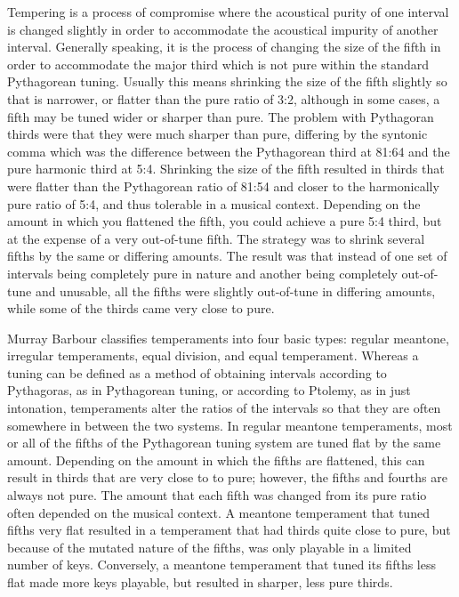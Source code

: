 Tempering is a process of compromise where the acoustical purity of one interval
is changed slightly in order to accommodate the acoustical impurity of another
interval.  Generally speaking, it is the process of changing the size of the fifth in
order to accommodate the major third which is not pure within the standard
Pythagorean tuning. Usually this means shrinking the size of the fifth slightly
so that is narrower, or flatter than the pure ratio of 3:2, although in some
cases, a fifth may be tuned wider or sharper than pure. The problem with
Pythagoran thirds were that they were much sharper than pure, differing by the
syntonic comma which was the difference between the Pythagorean third at 81:64
and the pure harmonic third at 5:4. Shrinking the size of the fifth resulted in
thirds that were flatter than the Pythagorean ratio of 81:54 and closer to the harmonically
pure ratio of 5:4, and thus tolerable
in a musical context.  Depending on the amount in which you flattened the fifth, you
could achieve a pure 5:4 third, but at the expense of a very out-of-tune fifth.  The
strategy was to shrink several fifths by the same or differing amounts. The result
was that instead of one set of intervals being completely pure in nature and
another being completely out-of-tune and unusable, all the fifths were slightly out-of-tune
in differing amounts, while some of the thirds came very close to pure.

Murray Barbour classifies temperaments into four basic types: regular meantone,
irregular temperaments, equal division, and equal temperament. Whereas
a tuning can be defined as a method of obtaining intervals according to
Pythagoras, as in Pythagorean tuning, or according to Ptolemy, as in
just intonation, temperaments alter the ratios of the intervals so
that they are often somewhere in between the two systems. In regular
meantone temperaments, most or all of the fifths of the Pythagorean tuning system
are tuned flat by the same amount.  Depending on the amount in which the fifths are
flattened, this can result in thirds that are very close to
to pure; however, the fifths and fourths are always not pure.  The amount
that each fifth was changed from its pure ratio often depended on the
musical context.  A meantone temperament that tuned fifths very flat
resulted in a temperament that had thirds quite close to pure, but
because of the mutated nature of the fifths, was only playable in
a limited number of keys.  Conversely, a meantone temperament that
tuned its fifths less flat made more keys playable,
but resulted in sharper, less pure thirds.

